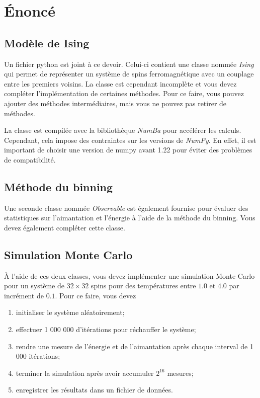 \documentclass[12pt, letterpaper]{article}
\numberwithin{table}{section}
\numberwithin{figure}{section}
\numberwithin{equation}{section}
\begin{document}
\section{Énoncé}\label{sec:enonce}

\subsection{Modèle de Ising}\label{subsec:modele-de-ising}

\noindent Un fichier python est joint à ce devoir.
Celui-ci contient une classe nommée \textit{Ising} qui permet de représenter
un système de spins ferromagnétique avec un couplage entre les premiers voisins.
La classe est cependant incomplète et vous devez compléter l'implémentation
de certaines méthodes.
Pour ce faire, vous pouvez ajouter des méthodes intermédiaires,
mais vous ne pouvez pas retirer de méthodes.

\bigskip

\noindent La classe est compilée avec la bibliothèque \textit{NumBa} pour accélérer les calculs.
Cependant, cela impose des contraintes sur les versions de \textit{NumPy}.
En effet, il est important de choisir une version de numpy avant 1.22 pour éviter des problèmes
de compatibilité.

\subsection{Méthode du binning}\label{subsec:methode-du-binning}

\noindent Une seconde classe nommée \textit{Observable} est également fournise pour
évaluer des statistiques sur l'aimantation et l'énergie à l'aide de la méthode du binning.
Vous devez également compléter cette classe.

\subsection{Simulation Monte Carlo}\label{subsec:simulation-monte-carlo}

\noindent À l'aide de ces deux classes, vous devez implémenter une simulation Monte Carlo
pour un système de $32 \times 32$ spins pour des températures entre $1.0$ et $4.0$
par incrément de $0.1$.
Pour ce faire, vous devez
\begin{enumerate}
    \item initialiser le système aléatoirement;
    \item effectuer 1 000 000 d'itérations pour réchauffer le système;
    \item rendre une mesure de l'énergie et de l'aimantation après chaque interval de 1 000 itérations;
    \item terminer la simulation après avoir accumuler $2^{16}$ mesures;
    \item enregistrer les résultats dans un fichier de données.
\end{enumerate}
\end{document}
